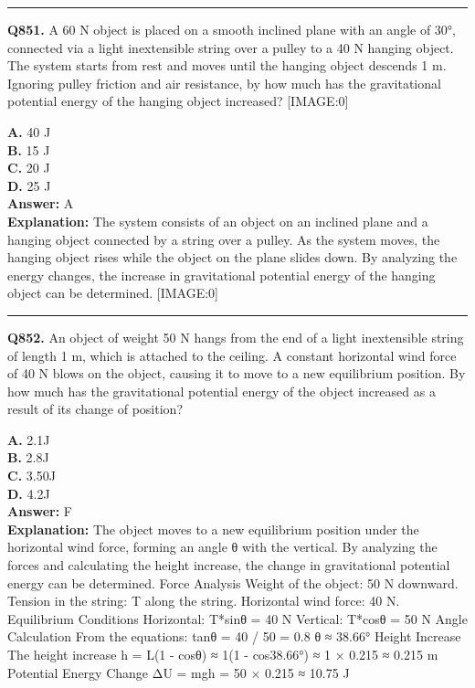 \documentclass[12pt]{article}
\begin{document}
\hrule
\vspace{1em}


\noindent
\textbf{Q851.} A 60 N object is placed on a smooth inclined plane with an angle of 30°, connected via a light inextensible string over a pulley to a 40 N hanging object. The system starts from rest and moves until the hanging object descends 1 m. Ignoring pulley friction and air resistance, by how much has the gravitational potential energy of the hanging object increased?
[IMAGE:0]



\textbf{A.} 40 J \\
\textbf{B.} 15 J \\
\textbf{C.} 20 J \\
\textbf{D.} 25 J \\

\textbf{Answer:} A \\
\textbf{Explanation:} The system consists of an object on an inclined plane and a hanging object connected by a string over a pulley. As the system moves, the hanging object rises while the object on the plane slides down. By analyzing the energy changes, the increase in gravitational potential energy of the hanging object can be determined.
[IMAGE:0]

\hrule
\vspace{1em}


\noindent
\textbf{Q852.} An object of weight 50 N hangs from the end of a light inextensible string of length 1 m, which is attached to the ceiling. A constant horizontal wind force of 40 N blows on the object, causing it to move to a new equilibrium position. By how much has the gravitational potential energy of the object increased as a result of its change of position?



\textbf{A.} 2.1J \\
\textbf{B.} 2.8J \\
\textbf{C.} 3.50J \\
\textbf{D.} 4.2J \\

\textbf{Answer:} F \\
\textbf{Explanation:} The object moves to a new equilibrium position under the horizontal wind force, forming an angle θ with the vertical. By analyzing the forces and calculating the height increase, the change in gravitational potential energy can be determined.
Force Analysis
Weight of the object: 50 N downward.
Tension in the string: T along the string.
Horizontal wind force: 40 N.
Equilibrium Conditions
Horizontal: T*sinθ = 40 N
Vertical: T*cosθ = 50 N
Angle Calculation
From the equations:
tanθ = 40 / 50 = 0.8 \to  θ ≈ 38.66°
Height Increase
The height increase h = L(1 - cosθ) ≈ 1(1 - cos38.66°) ≈ 1 × 0.215 ≈ 0.215 m
Potential Energy Change
ΔU = mgh = 50 × 0.215 ≈ 10.75 J
\end{document}
